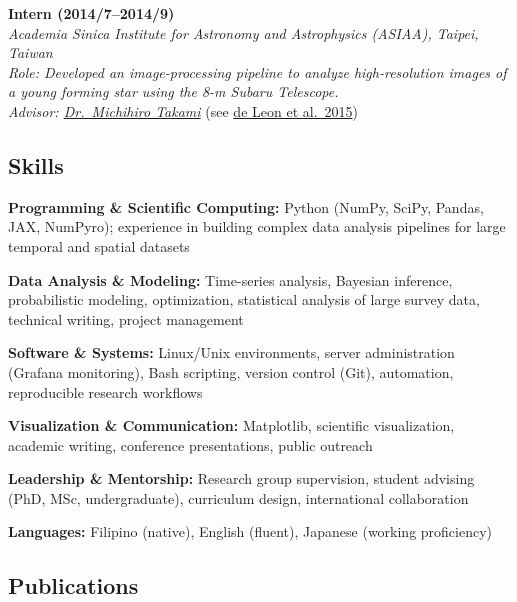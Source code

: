 \documentclass[12pt,letterpaper]{article}
\begin{document}
\begin{list}{}{\cvlist}
    \item 
        \textbf{Intern (2014/7--2014/9)}\\
        \textit{Academia Sinica Institute for Astronomy and Astrophysics (ASIAA), Taipei, Taiwan}\\	
        \textit{Role: Developed an image-processing pipeline to analyze high-resolution images of a young forming star using the 8-m Subaru Telescope.}\\
        \textit{Advisor: \href{takamiurl}{Dr.\ Michihiro Takami}} (see \href{\paperone}{de Leon et al.\ 2015})
\end{list}

\subsection{Skills}
\begin{list}{}{\cvlist}
    \item \textbf{Programming \& Scientific Computing:} 
    Python (NumPy, SciPy, Pandas, JAX, NumPyro); experience in building complex data analysis pipelines for large temporal and spatial datasets    
    \item \textbf{Data Analysis \& Modeling:} 
    Time-series analysis, Bayesian inference, probabilistic modeling, optimization, statistical analysis of large survey data, technical writing, project management
    \item \textbf{Software \& Systems:} 
    Linux/Unix environments, server administration (Grafana monitoring), Bash scripting, version control (Git), automation, reproducible research workflows
    \item \textbf{Visualization \& Communication:} 
    Matplotlib, scientific visualization, academic writing, conference presentations, public outreach
    \item \textbf{Leadership \& Mentorship:} 
    Research group supervision, student advising (PhD, MSc, undergraduate), curriculum design, international collaboration
    \item \textbf{Languages:} 
    Filipino (native), English (fluent), Japanese (working proficiency)
\end{list}

\ifdefined\withpubs
  \subsection{Publications}
  
  \begin{list}{}{\cvlist}
    
  \end{list}
\end{document}
